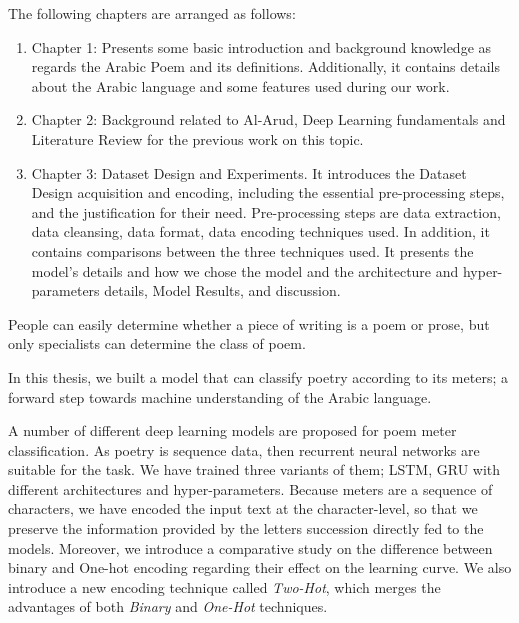 \begin{spacing}{1}\end{spacing}
The following chapters are arranged as follows:
\begin{enumerate}
\item Chapter 1: Presents some basic introduction and background knowledge as regards the Arabic Poem and its definitions. Additionally, it contains details about the Arabic language and some features used during our work.
  \item Chapter 2: Background related to Al-Arud, Deep Learning fundamentals and Literature Review for the previous work on this topic.
  \item Chapter 3: Dataset Design and Experiments. It introduces the Dataset Design acquisition and encoding, including the essential pre-processing steps, and the justification for their need. Pre-processing steps are data extraction, data cleansing, data format, data encoding techniques used. In addition, it contains comparisons between the three techniques used. It presents the model’s details and how we chose the model and the architecture and hyper-parameters details, Model Results, and discussion.
\end{enumerate}


\begin{spacing}{1}\end{spacing}

People can easily determine whether a piece of writing is a poem or prose, but only specialists can determine the class of poem.

In this thesis, we built a model that can classify poetry according to its meters; a forward step towards machine understanding of the Arabic language.

A number of different deep learning models are proposed for poem meter classification. As poetry is sequence data, then recurrent neural networks are suitable for the task. We have trained three variants of them; LSTM, GRU with different architectures and hyper-parameters. Because meters are a sequence of characters, we have encoded the input text at the character-level, so that we preserve the information provided by the letters succession directly fed to the models. Moreover, we introduce a comparative study on the difference between binary and One-hot encoding regarding their effect on the learning curve. We also introduce a new encoding technique called \textit{Two-Hot}, which merges the advantages of both \textit{Binary} and \textit{One-Hot} techniques.



